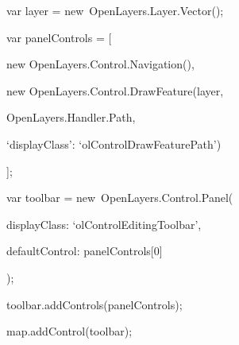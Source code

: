 \documentclass{article}
\begin{document}
var layer = new OpenLayers.Layer.Vector();

var panelControls = [

new OpenLayers.Control.Navigation(),

new OpenLayers.Control.DrawFeature(layer,

OpenLayers.Handler.Path,

{‘displayClass’: ‘olControlDrawFeaturePath’})

];

var toolbar = new OpenLayers.Control.Panel({

displayClass: ‘olControlEditingToolbar’,

defaultControl: panelControls[0]

});

toolbar.addControls(panelControls);

map.addControl(toolbar);
\end{document}
